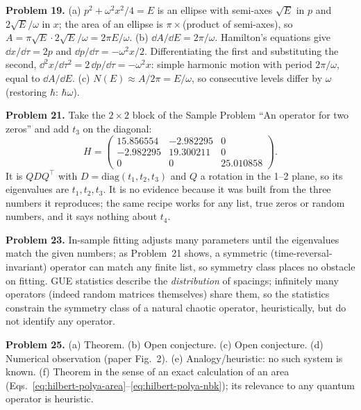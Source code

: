 \textbf{Problem 19.} (a) $p^2+\omega^2x^2/4=E$ is an ellipse with semi-axes $\sqrt E$ in $p$ and $2\sqrt E/\omega$ in $x$; the area of an ellipse is $\pi\times$(product of semi-axes), so $A=\pi\sqrt E\cdot2\sqrt E/\omega=2\pi E/\omega$. (b) $\dd A/\dd E=2\pi/\omega$. Hamilton's equations give $\dd x/\dd\tau=2p$ and $\dd p/\dd\tau=-\omega^2x/2$. Differentiating the first and substituting the second, $\dd^2x/\dd\tau^2=2\,\dd p/\dd\tau=-\omega^2x$: simple harmonic motion with period $2\pi/\omega$, equal to $\dd A/\dd E$. (c) $N(E)\approx A/2\pi=E/\omega$, so consecutive levels differ by $\omega$ (restoring $\hbar$: $\hbar\omega$).

\textbf{Problem 21.} Take the $2\times2$ block of the Sample Problem ``An operator for two zeros'' and add $t_3$ on the diagonal:
\[
H=\begin{pmatrix}15.856554&-2.982295&0\\-2.982295&19.300211&0\\0&0&25.010858\end{pmatrix}.
\]
It is $QDQ^\top$ with $D=\mathrm{diag}(t_1,t_2,t_3)$ and $Q$ a rotation in the 1--2 plane, so its eigenvalues are $t_1,t_2,t_3$. It is no evidence because it was built from the three numbers it reproduces; the same recipe works for any list, true zeros or random numbers, and it says nothing about $t_4$.

\textbf{Problem 23.} In-sample fitting adjusts many parameters until the eigenvalues match the given numbers; as Problem~21 shows, a symmetric (time-reversal-invariant) operator can match any finite list, so symmetry class places no obstacle on fitting. GUE statistics describe the \emph{distribution} of spacings; infinitely many operators (indeed random matrices themselves) share them, so the statistics constrain the symmetry class of a natural chaotic operator, heuristically, but do not identify any operator.

\textbf{Problem 25.} (a) Theorem. (b) Open conjecture. (c) Open conjecture. (d) Numerical observation (paper Fig.~2). (e) Analogy/heuristic: no such system is known. (f) Theorem in the sense of an exact calculation of an area (Eqs.~\eqref{eq:hilbert-polya-area}--\eqref{eq:hilbert-polya-nbk}); its relevance to any quantum operator is heuristic.
